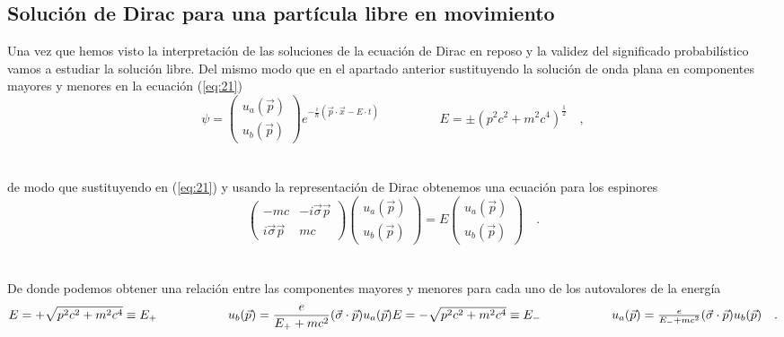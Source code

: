 \documentclass[11pt,letterpaper]{article}     %
\begin{document}
\subsection{Solución de Dirac para una partícula libre en movimiento}






Una vez que hemos visto la interpretación de las soluciones de la ecuación de Dirac en reposo y la validez del significado probabilístico vamos a estudiar la solución libre. Del mismo modo que en el apartado anterior sustituyendo la solución de onda plana en componentes mayores y menores en la ecuación (\ref{eq:21})
\begin{equation} \label{eq:53}
\psi = \begin{pmatrix}
u_a (\vec{p}) \\ u_b (\vec{p})
\end{pmatrix} e^{-\frac{i}{\hbar}(\vec{p}\cdot \vec{x}- E \cdot t)} \hspace{2cm} E=\pm (p^2c^2 + m^2c^4)^\frac{1}{2} \quad ,
\end{equation} \\ \\
de modo que sustituyendo en (\ref{eq:21}) y usando la representación de Dirac obtenemos una ecuación para los espinores
\begin{equation} \label{eq:54}
\begin{pmatrix}
-mc & -i \vec{\sigma}\vec{p} \\ i\vec{\sigma}\vec{p} & mc
\end{pmatrix}
\begin{pmatrix}
u_a (\vec{p}) \\ u_b (\vec{p})
\end{pmatrix}= E
\begin{pmatrix}
u_a(\vec{p}) \\ u_b(\vec{p})
\end{pmatrix} \quad .
\end{equation} \\ \\
De donde podemos obtener una relación entre las componentes mayores y menores para cada uno de los autovalores de la energía
\begin{equation} \label{eq:55}
E=+\sqrt{p^2c^2+m^2c^4} \equiv E_+ \hspace{2cm} u_b(\vec{p})=\frac{e}{E_+ + mc^2}(\vec{\sigma} \cdot \vec{p})u_a(\vec{p}) $$\\$$ 
E=-\sqrt{p^2c^2+m^2c^4} \equiv E_- \hspace{2cm} u_a(\vec{p})=\frac{e}{E_- + mc^2}(\vec{\sigma} \cdot \vec{p})u_b(\vec{p}) \quad.
\end{equation} \\ \\
\end{document}
